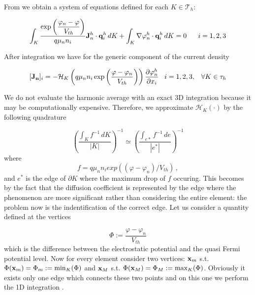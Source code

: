 From  we obtain a system of equations defined for each $K \in \mathcal{T}_h$:

\begin{equation}
\label{eq: variation form of current density}
\int_K \dfrac{ \exp \left( \dfrac{\varphi_n-\varphi}{V_{th}} \right) }{q \mu_n n_i} \vect{J}_n^h \cdot \vect{q}^h_i \, dK
 + \int_K \nabla \varphi_n^h \cdot \vect{q}^h_i \, dK = 0 \psp{10}  i=1,2,3
\end{equation}

After integration we have for the generic component of the current density

\begin{equation}
\label{eq: first formula for J}
[\vect{J_n}]_i = - \mathcal{H}_K \left( q \mu_n n_i \exp \left( \dfrac{\varphi-\varphi_n}{V_{th}} \right)  \right) \dfrac{\partial \varphi_n^h}{\partial x_i} \psp{5} i = 1,2,3, \psp{5} \forall K \in \tau_h
\end{equation}

We do not evaluate the harmonic average with an exact 3D integration because it may be computationally expensive. Therefore, we approximate $\mathcal{H}_K(\cdot)$ by the following quadrature

\begin{equation}
\label{eq: approzimation from 3D to edge}
\left(\dfrac{\int_K f^{-1} \, dK}{|K|} \right)^{-1} \simeq \left(\dfrac{\int_{e*} f^{-1} \, de}{|e^*|} \right)^{-1}
\end{equation}
 where 
\begin{equation*}
 f=q \mu_n n_i exp((\varphi-\varphi_n)/V_{th}) \, ,
\end{equation*} 
 and $e^*$ is the edge of $\partial K$ where the maximum drop of $f$ occuring.
This becomes by the fact that the diffusion coefficient is represented by the edge where the phenomenon are more significant rather than considering the entire element: the problem now is the indentification of the correct edge. Let us consider a quantity defined at the vertices

\begin{equation}
\label{eq: differenza tra pot e qf}
\Phi := \dfrac{\varphi - 	\varphi_n}{V_{th}}
\end{equation}
which is the difference between the electrostatic potential and the quasi Fermi potential level. Now for every element consider two vertices: $\mathbf{x}_m$ s.t. $\Phi(\mathbf{x}_m)=\Phi_m := \min_K(\Phi)$ and $\mathbf{x}_M$ s.t. $\Phi(\mathbf{x}_M)=\Phi_M:=\max_K(\Phi)$. Obviously it exists only one edge which connects these two points and on this one we perform the 1D integration .

